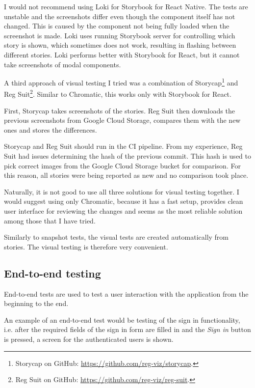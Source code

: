 \documentclass[
  digital, %
  table,   %
  oneside, %
  lof,     %
  lot,     %
]{fithesis3}
\begin{document}
I would not recommend using Loki for Storybook for React Native. The tests are unstable and the screenshots differ even though the component itself has not changed. This is caused by the component not being fully loaded when the screenshot is made. Loki uses running Storybook server for controlling which story is shown, which sometimes does not work, resulting in flashing between different stories.
Loki performs better with Storybook for React, but it cannot take screenshots of modal components.

A third approach of visual testing I tried was a combination of Storycap\footnote{Storycap on GitHub: \url{https://github.com/reg-viz/storycap}.} and Reg Suit\footnote{Reg Suit on GitHub: \url{https://github.com/reg-viz/reg-suit}.}. Similar to Chromatic, this works only with Storybook for React.

First, Storycap takes screenshots of the stories. Reg Suit then downloads the previous screenshots from Google Cloud Storage, compares them with the new ones and stores the differences. 

Storycap and Reg Suit should run in the CI pipeline. From my experience, Reg Suit had issues determining the hash of the previous commit. This hash is used to pick correct images from the Google Cloud Storage bucket for comparison. For this reason, all stories were being reported as new and no comparison took place.

Naturally, it is not good to use all three solutions for visual testing together. I would suggest using only Chromatic, because it has a fast setup, provides clean user interface for reviewing the changes and seems as the most reliable solution among those that I have tried.

Similarly to snapshot tests, the visual tests are created automatically from stories. The visual testing is therefore very convenient.

\subsection{End-to-end testing}
\label{sec:end_to_end_testing}
End-to-end tests are used to test a user interaction with the application from the beginning to the end. 

An example of an end-to-end test would be testing of the sign in functionality, i.e. after the required fields of the sign in form are filled in and the \textit{Sign in} button is pressed, a screen for the authenticated users is shown.
\end{document}
